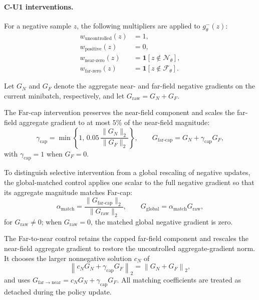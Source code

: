 \documentclass{article}
\theoremstyle{plain}
\theoremstyle{definition}
\theoremstyle{remark}
\begin{document}
\paragraph{C-U1 interventions.}
For a negative sample $z$, the following multipliers are applied to
$g_\theta^-(z)$:
\begin{equation}
\begin{aligned}
    w_{\mathrm{uncontrolled}}(z)
    &=1,\\
    w_{\mathrm{positive}}(z)
    &=0,\\
    w_{\mathrm{near\text{-}zero}}(z)
    &=
    \mathbf 1[z\notin\mathcal N_\theta],\\
    w_{\mathrm{far\text{-}zero}}(z)
    &=
    \mathbf 1[z\notin\mathcal F_\theta].
\end{aligned}
\label{eq:causal_zero_interventions}
\end{equation}

Let \(G_N\) and \(G_F\) denote the aggregate near- and far-field negative
gradients on the current minibatch, respectively, and let
\(G_{\mathrm{raw}}=G_N+G_F\).

The Far-cap intervention preserves the near-field component and scales the
far-field aggregate gradient to at most \(5\%\) of the near-field magnitude:
\begin{equation}
    \gamma_{\mathrm{cap}}
    =
    \min\left\{
        1,\,
        0.05\,
        \frac{\lVert G_N\rVert_2}
             {\lVert G_F\rVert_2}
    \right\},
    \qquad
    G_{\mathrm{far\text{-}cap}}
    =
    G_N+\gamma_{\mathrm{cap}}G_F,
    \label{eq:causal_far_cap}
\end{equation}
with \(\gamma_{\mathrm{cap}}=1\) when \(G_F=0\).

To distinguish selective intervention from a global rescaling of negative
updates, the global-matched control applies one scalar to the full negative
gradient so that its aggregate magnitude matches Far-cap:
\begin{equation}
    \alpha_{\mathrm{match}}
    =
    \frac{
        \lVert G_{\mathrm{far\text{-}cap}}\rVert_2
    }{
        \lVert G_{\mathrm{raw}}\rVert_2
    },
    \qquad
    G_{\mathrm{global}}
    =
    \alpha_{\mathrm{match}}G_{\mathrm{raw}},
    \label{eq:causal_global_weight}
\end{equation}
for \(G_{\mathrm{raw}}\neq0\); when \(G_{\mathrm{raw}}=0\), the matched global
negative gradient is zero.

The Far-to-near control retains the capped far-field component and rescales
the near-field aggregate gradient to restore the uncontrolled
aggregate-gradient norm. It chooses the larger nonnegative solution \(c_N\)
of
\begin{equation}
    \left\|
        c_N G_N+\gamma_{\mathrm{cap}}G_F
    \right\|_2
    =
    \left\|
        G_N+G_F
    \right\|_2,
    \label{eq:causal_far_to_near}
\end{equation}
and uses
\(
G_{\mathrm{far\to near}}
=
c_N G_N+\gamma_{\mathrm{cap}}G_F.
\)
All matching coefficients are treated as detached during the policy update.
\end{document}
